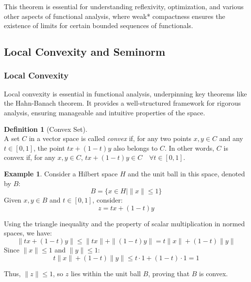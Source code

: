 \documentclass[12pt, reqno]{amsart}
\theoremstyle{definition}
\newtheorem{definition}[theorem]{Definition}
\newtheorem{example}[theorem]{Example}
\numberwithin{equation}{section}
\newcommand{\dR}{{\mathbb R}}
\begin{document}
This theorem is essential for understanding reflexivity, optimization, and various other aspects of functional analysis, where weak* compactness ensures the existence of limits for certain bounded sequences of functionals.


\subsection{Local Convexity and Seminorm}
\subsubsection{Local Convexity}
Local convexity is essential in functional analysis, underpinning key theorems like the Hahn-Banach theorem. It provides a well-structured framework for rigorous analysis, ensuring manageable and intuitive properties of the space.
\begin{definition} [Convex Set] \hfill \\
     A set $C$ in a vector space is called \textit{convex} if, for any two points $x, y \in C$ and any $ t \in [0, 1] $, the point $ tx + (1-t)y $ also belongs to $ C $. In other words, $ C $ is convex if, for any $ x, y \in C $, $ tx + (1-t)y \in C \quad \forall t \in [0, 1]. $
\end{definition}
\begin{comment}
\begin{example}
Consider the set $C$ defined as the unit disk in $\dR^2$:
\[
C = \{ (x, y) \in \dR^2 \mid x^2 + y^2 \leq 1 \}.
\]
Take any two points $(x_1, y_1)$ and $(x_2, y_2)$ in $C$. Verify that for any $t \in [0, 1]$:
\[ (x_t, y_t) = t(x_1, y_1) + (1-t)(x_2, y_2)  \in C \]
We know that: 
\[
x_t = tx_1 + (1-t)x_2, \quad y_t = ty_1 + (1-t)y_2.
\]
Thus:
\[
x_t^2 + y_t^2 = (tx_1 + (1-t)x_2)^2 + (ty_1 + (1-t)y_2)^2.
\]

Since $(x_1, y_1) \text{ and } (x_2, y_2) \in C$, then $x_1^2 + y_1^2 \leq 1$ and $x_2^2 + y_2^2 \leq 1$. By the properties of convex combinations, we have:
\[
x_t^2 + y_t^2 \leq t(x_1^2 + y_1^2) + (1-t)(x_2^2 + y_2^2) \leq t \cdot 1 + (1-t) \cdot 1 = 1.
\]
Therefore, $(x_t, y_t) \in C$, hence, $C$ is convex.
\end{example}    
\end{comment}


\begin{example}
Consider a Hilbert space $H$ and the unit ball in this space, denoted by $B$:
\[
B = \{ x \in H \mid \|x\| \leq 1 \}
\]
Given $x, y \in B$ and $t \in [0,1]$, consider:
\[
z = tx + (1-t)y
\]

Using the triangle inequality and the property of scalar multiplication in normed spaces, we have:
\[
\|tx + (1-t)y\| \leq \|tx\| + \|(1-t)y\| = t\|x\| + (1-t)\|y\|
\]
Since $\|x\| \leq 1$ and $\|y\| \leq 1$:
\[
t\|x\| + (1-t)\|y\| \leq t \cdot 1 + (1-t) \cdot 1 = 1
\]

Thus, $\|z\| \leq 1$, so $z$ lies within the unit ball $B$, proving that $B$ is convex.
\end{example}
\end{document}
